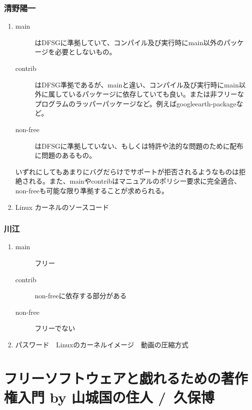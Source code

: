 \documentclass[cjk,dvipdfmx,10pt,%
hyperref={bookmarks=true,bookmarksnumbered=true,bookmarksopen=false,%
colorlinks=false,%
pdftitle={第 58 回 関西 Debian 勉強会},%
pdfauthor={倉敷・のがた・河田・佐々木},%
pdfsubject={資料},%
}]{beamer}
\begin{document}
\begin{frame}
\frametitle{清野陽一}
  \begin{enumerate}
  \item
    \begin{description}
    \item [main]はDFSGに準拠していて、コンパイル及び実行時にmain以外のパッケージを必要としないもの。
    \item [contrib]はDFSG準拠であるが、mainと違い、コンパイル及び実行時にmain以外に属しているパッケージに依存していても良い。または非フリーなプログラムのラッパーパッケージなど。例えばgoogleearth-packageなど。
    \item [non-free]はDFSGに準拠していない、もしくは特許や法的な問題のために配布に問題のあるもの。
    \end{description}
    いずれにしてもあまりにバグだらけでサポートが拒否されるようなものは拒絶される。また、mainやcontribはマニュアルのポリシー要求に完全適合、non-freeも可能な限り準拠することが求められる。
  \item Linux カーネルのソースコード
  \end{enumerate}
\end{frame}

\begin{frame}
\frametitle{ 川江 }
  \begin{enumerate}
  \item
    \begin{description}
    \item [main] フリー
    \item [contrib] non-freeに依存する部分がある
    \item [non-free] フリーでない
    \end{description}
  \item パスワード　Linuxのカーネルイメージ　動画の圧縮方式
  \end{enumerate}
\end{frame}



\section{フリーソフトウェアと戯れるための著作権入門  by 山城国の住人 /\  久保博}

\end{document}

